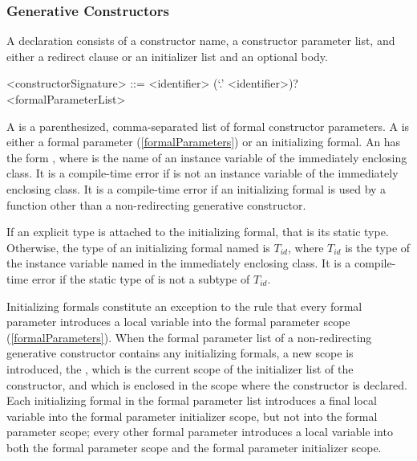 \documentclass[makeidx]{article}
\begin{document}
\subsubsection{Generative Constructors}

\LMHash{}%
A 
declaration consists of a constructor name, a constructor parameter list,
and either a redirect clause or an initializer list and an optional body.

\begin{grammar}
<constructorSignature> ::= \gnewline{}
  <identifier> (`.' <identifier>)? <formalParameterList>
\end{grammar}

\LMHash{}%
A  is a parenthesized, comma-separated list of formal constructor parameters.
A  is either a formal parameter (\ref{formalParameters}) or an initializing formal.
An  has the form , where \id{} is the name of an instance variable of the immediately enclosing class.
It is a compile-time error if \id{} is not an instance variable of the immediately enclosing class.
It is a compile-time error if an initializing formal is used by a function other than a non-redirecting generative constructor.

\LMHash{}%
If an explicit type is attached to the initializing formal, that is its static type.
Otherwise, the type of an initializing formal named \id{} is $T_{id}$, where $T_{id}$ is the type of the instance variable named \id{} in the immediately enclosing class.
It is a compile-time error if the static type of \id{} is not a subtype of $T_{id}$.

\LMHash{}%
Initializing formals constitute an exception to the rule that
every formal parameter introduces a local variable into
the formal parameter scope (\ref{formalParameters}).
When the formal parameter list of a non-redirecting generative constructor
contains any initializing formals, a new scope is introduced, the
,
which is the current scope of the initializer list of the constructor,
and which is enclosed in the scope where the constructor is declared.
Each initializing formal in the formal parameter list introduces a final local variable into the formal parameter initializer scope, but not into the formal parameter scope; every other formal parameter introduces a local variable into both the formal parameter scope and the formal parameter initializer scope.
\end{document}
